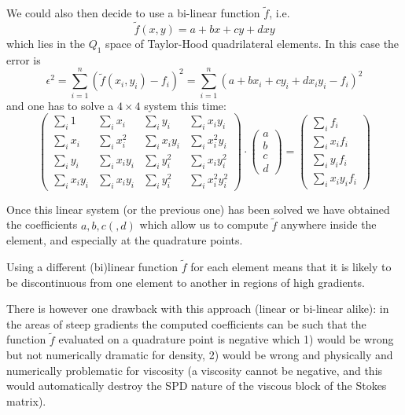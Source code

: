 We could also then decide to use a bi-linear function $\tilde{f}$, i.e.
\[
\tilde{f}(x,y)=a+bx+cy+dxy
\]
which lies in the $Q_1$ space of Taylor-Hood quadrilateral elements. In this case the error is 
\[
\epsilon^2 
= \sum_{i=1}^n ( \tilde{f}(x_i,y_i)-f_i)^2
= \sum_{i=1}^n (a+bx_i+cy_i + dx_iy_i -f_i)^2
\]
and one has to solve a $4\times 4$ system this time:
\[
\left( 
\begin{array}{cccc}
\sum\limits_i 1 & \sum\limits_i x_i & \sum\limits_i y_i & \sum\limits_i x_iy_i\\
\sum\limits_i x_i & \sum\limits_i x_i^2 & \sum\limits_i x_iy_i & \sum\limits_i x_i^2 y_i\\
\sum\limits_i y_i & \sum\limits_i x_i y_i & \sum\limits_i y_i^2 & \sum\limits_i x_iy_i^2\\ 
\sum\limits_i x_iy_i & \sum\limits_i x_i y_i & \sum\limits_i y_i^2 & \sum\limits_i x_i^2y_i^2  
\end{array}
\right)
\cdot
\left(
\begin{array}{c}
a\\
b\\
c\\
d
\end{array}
\right)
=
\left(
\begin{array}{c}
\sum\limits_i f_i \\
\sum\limits_i x_i f_i \\
\sum\limits_i y_i f_i \\
\sum\limits_i x_i y_i f_i 
\end{array}
\right)
\]


Once this linear system (or the previous one) has been solved we have obtained the coefficients $a,b,c(,d)$ 
which allow us to compute $\tilde{f}$ anywhere inside the element, and especially 
at the quadrature points. 

\begin{remark}
Using a different (bi)linear function $\tilde{f}$ for each element 
means that it is likely to be discontinuous 
from one element to another in regions of high gradients. 
\end{remark}

There is however one drawback with this approach (linear or bi-linear alike):
in the areas of steep gradients the computed coefficients can be such that 
the function $\tilde{f}$ evaluated on a quadrature point 
is negative  which 1) would be wrong but not numerically 
dramatic for density, 2) would be wrong and physically and numerically 
problematic for viscosity (a viscosity cannot be negative, and this would 
automatically destroy the SPD nature of the viscous block of the Stokes matrix).

